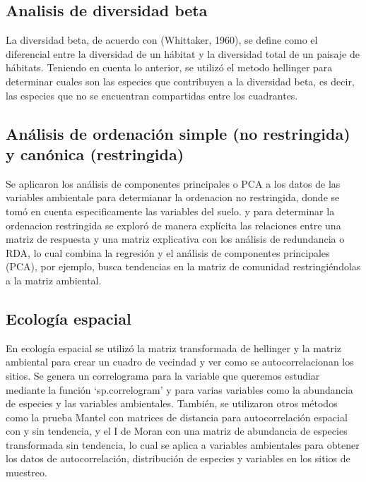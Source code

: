 \documentclass[11pt,]{article}
\begin{document}
\subsection{Analisis de diversidad
beta}\label{analisis-de-diversidad-beta}

La diversidad beta, de acuerdo con (Whittaker, 1960), se define como el
diferencial entre la diversidad de un hábitat y la diversidad total de
un paisaje de hábitats. Teniendo en cuenta lo anterior, se utilizó el
metodo hellinger para determinar cuales son las especies que contribuyen
a la diversidad beta, es decir, las especies que no se encuentran
compartidas entre los cuadrantes.

\subsection{Análisis de ordenación simple (no restringida) y canónica
(restringida)}\label{anuxe1lisis-de-ordenaciuxf3n-simple-no-restringida-y-canuxf3nica-restringida}

Se aplicaron los análisis de componentes principales o PCA a los datos
de las variables ambientale para determianar la ordenacion no
restringida, donde se tomó en cuenta especificamente las variables del
suelo. y para determinar la ordenacion restringida se exploró de manera
explícita las relaciones entre una matriz de respuesta y una matriz
explicativa con los análisis de redundancia o RDA, lo cual combina la
regresión y el análisis de componentes principales (PCA), por ejemplo,
busca tendencias en la matriz de comunidad restringiéndolas a la matriz
ambiental.

\subsection{Ecología espacial}\label{ecologuxeda-espacial}

En ecología espacial se utilizó la matriz transformada de hellinger y la
matriz ambiental para crear un cuadro de vecindad y ver como se
autocorrelacionan los sitios. Se genera un correlograma para la variable
que queremos estudiar mediante la función `sp.correlogram' y para varias
variables como la abundancia de especies y las variables ambientales.
También, se utilizaron otros métodos como la prueba Mantel con matrices
de distancia para autocorrelación espacial con y sin tendencia, y el I
de Moran con una matriz de abundancia de especies transformada sin
tendencia, lo cual se aplica a variables ambientales para obtener los
datos de autocorrelación, distribución de especies y variables en los
sitios de muestreo.
\end{document}
